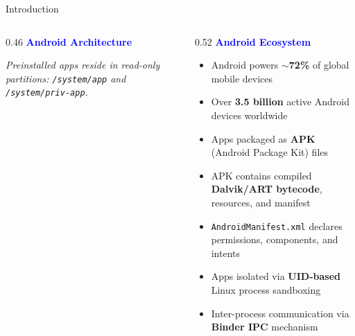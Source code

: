 \documentclass[aspectratio=169]{beamer}
\begin{document}
\begin{frame}{Introduction}
\begin{columns}[T]
    \begin{column}{0.46\textwidth}
        \textbf{\textcolor{blue}{Android Architecture}}
        \vspace{4pt}


        \vspace{6pt}
        \footnotesize
        \textit{Preinstalled apps reside in read-only partitions:
        \texttt{/system/app} and \texttt{/system/priv-app}.}
    \end{column}

    \begin{column}{0.52\textwidth}
        \textbf{\textcolor{blue}{Android Ecosystem}}
        \begin{itemize}
            \item Android powers \textbf{$\sim$72\%} of global mobile devices
            \item Over \textbf{3.5 billion} active Android devices worldwide
            \item Apps packaged as \textbf{APK} (Android Package Kit) files
            \item APK contains compiled \textbf{Dalvik/ART bytecode},
                  resources, and manifest
            \item \texttt{AndroidManifest.xml} declares permissions, components,
                  and intents
            \item Apps isolated via \textbf{UID-based} Linux process sandboxing
            \item Inter-process communication via \textbf{Binder IPC} mechanism
        \end{itemize}
    \end{column}
\end{columns}
\end{frame}
\end{document}

